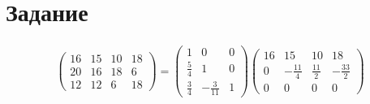 \section{Задание}

\begin{gather}
    \begin{pmatrix}
        16 & 15 & 10 & 18 \\
        20 & 16 & 18 & 6 \\
        12 & 12 & 6 & 18
    \end{pmatrix}
    =
    \begin{pmatrix}
        1 & 0 & 0\\
        \frac{5}{4} & 1 & 0\\
        \frac{3}{4} & - \frac{3}{11} & 1
    \end{pmatrix}
    \begin{pmatrix} 
        16 & 15 & 10 & 18 \\ 
        0 & - \frac{11}{4} & \frac{11}{2} & - \frac{33}{2} \\ 
        0 & 0 & 0 & 0
    \end{pmatrix}
\end{gather}




